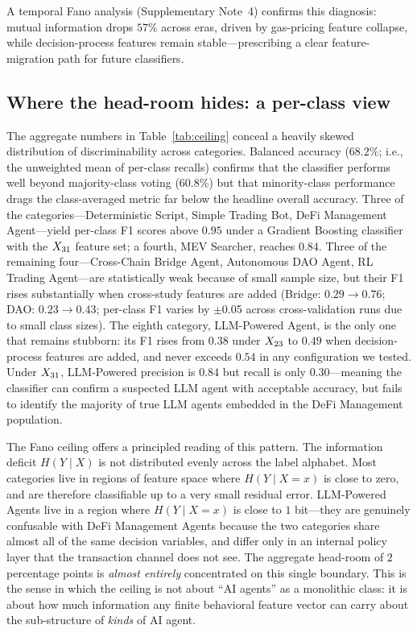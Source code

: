 \documentclass[11pt,a4paper]{article}
\begin{document}
A temporal Fano analysis (Supplementary Note~4) confirms this diagnosis: mutual information drops $57\%$ across eras, driven by gas-pricing feature collapse, while decision-process features remain stable---prescribing a clear feature-migration path for future classifiers.

\subsection*{Where the head-room hides: a per-class view}

The aggregate numbers in Table~\ref{tab:ceiling} conceal a heavily skewed
distribution of discriminability across categories.
Balanced accuracy ($68.2\%$; i.e., the unweighted mean of per-class recalls)
confirms that the classifier performs well beyond majority-class voting
($60.8\%$) but that minority-class performance drags the class-averaged metric
far below the headline overall accuracy.
Three of the \nClasses{}
categories---Deterministic Script, Simple Trading Bot, DeFi Management
Agent---yield per-class F1 scores above $0.95$ under a Gradient Boosting
classifier with the $X_{31}$ feature set; a fourth, MEV Searcher, reaches
$0.84$. Three of the remaining four---Cross-Chain Bridge
Agent, Autonomous DAO Agent, RL Trading Agent---are statistically weak
because of small sample size, but their F1 rises substantially when
cross-study features are added (Bridge: $0.29 \to 0.76$; DAO:
$0.23 \to 0.43$; per-class F1 varies by $\pm$0.05 across cross-validation runs due to small class sizes). The eighth category, LLM-Powered Agent, is the only one
that remains stubborn: its F1 rises from $0.38$ under $X_{23}$ to
$0.49$ when decision-process features are added, and never exceeds
$0.54$ in any configuration we tested. Under $X_{31}$, LLM-Powered precision is
$0.84$ but recall is only $0.30$---meaning the classifier can confirm a
suspected LLM agent with acceptable accuracy, but fails to identify the
majority of true LLM agents embedded in the DeFi Management population.

The Fano ceiling offers a principled reading of this pattern. The
information deficit $H(Y\mid X)$ is not distributed evenly across the
label alphabet. Most categories live in regions of feature space where
$H(Y\mid X=x)$ is close to zero, and are therefore classifiable up to a
very small residual error. LLM-Powered Agents live in a region where
$H(Y\mid X=x)$ is close to $1$ bit---they are genuinely confusable with
DeFi Management Agents because the two categories share almost all of the
same decision variables, and differ only in an internal policy layer that
the transaction channel does not see. The aggregate head-room of $2$
percentage points is \emph{almost entirely} concentrated on this single
boundary. This is the sense in which the ceiling is not about ``AI
agents'' as a monolithic class: it is about how much information any
finite behavioral feature vector can carry about the sub-structure of
\emph{kinds} of AI agent.
\end{document}
